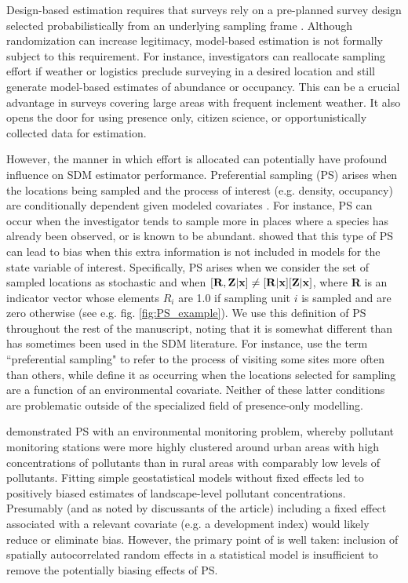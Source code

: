 \documentclass[times,mee,doublespace,]{besauth2}
\begin{document}
Design-based estimation requires that surveys rely on a pre-planned survey design selected probabilistically from an underlying sampling frame \citep{Cochran1977}.  Although randomization can increase legitimacy, model-based estimation is not formally subject to this requirement.  For instance, investigators can reallocate sampling effort if weather or logistics preclude surveying in a desired location and still generate model-based estimates of abundance or occupancy.  This can be a crucial advantage in surveys covering large areas with frequent inclement weather.  It also opens the door for using presence only, citizen science, or opportunistically collected data for estimation.

However, the manner in which effort is allocated can potentially have profound influence on SDM estimator performance.   Preferential sampling (PS) arises when the locations being sampled and the process of interest (e.g. density, occupancy) are conditionally dependent given modeled covariates \citep{DiggleEtAl2010}.  For instance, PS can occur when the investigator tends to sample more in places where a species has already been observed, or is known to be abundant. \citet{DiggleEtAl2010} showed that this type of PS can lead to bias when this extra information is not included in models for the state variable of interest.  Specifically, PS arises when we consider the set of sampled locations as stochastic and when $[{\bf R},{\bf Z} | {\bf x}] \neq [{\bf R}|{\bf x}][{\bf Z}|{\bf x}]$, where \textbf{R} is an indicator vector whose elements $R_i$ are 1.0 if sampling unit $i$ is sampled and are zero otherwise (see e.g. fig. \ref{fig:PS_example}).  We use this definition of PS throughout the rest of the manuscript, noting that it is somewhat different than has sometimes been used in the SDM literature.  For instance, \citet{MerckxEtAl2011} use the term ``preferential sampling" to refer to the process of visiting some sites more often than others, while \citet{ManceurKuhn2014} define it as occurring when the locations selected for sampling are a function of an environmental covariate.  Neither of these latter conditions are problematic outside of the specialized field of presence-only modelling.

\citet{DiggleEtAl2010} demonstrated PS with an environmental monitoring problem, whereby pollutant monitoring stations were more highly clustered around urban areas with high concentrations of pollutants than in rural areas with comparably low levels of pollutants.  Fitting simple geostatistical models without fixed effects led to positively biased estimates of landscape-level pollutant concentrations.  Presumably (and as noted by discussants of the article) including a fixed effect associated with a relevant covariate (e.g. a development index) would likely reduce or eliminate bias.  However, the primary point of \citet{DiggleEtAl2010} is well taken: inclusion of spatially autocorrelated random effects in a statistical model is insufficient to remove the potentially biasing effects of PS.
\end{document}
